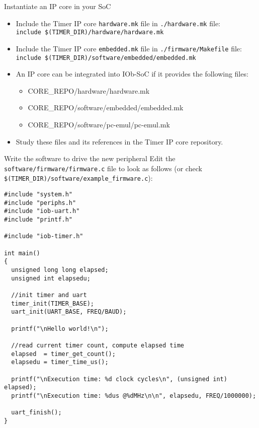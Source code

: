\documentclass [xcolor=svgnames, t] {beamer}
\begin{document}
\begin{frame}{Instantiate an IP core in your SoC}
  \begin{itemize}
  \item Include the Timer IP core {\tt hardware.mk} file in {\tt ./hardware.mk} file:\\
    {\tt \tiny include \$(TIMER\_DIR)/hardware/hardware.mk}
  \item Include the Timer IP core {\tt embedded.mk} file in {\tt ./firmware/Makefile} file:\\
    {\tt \tiny include \$(TIMER\_DIR)/software/embedded/embedded.mk}
  \item An IP core can be integrated into IOb-SoC if it provides the following files:
    \begin{itemize}
    \item CORE\_REPO/hardware/hardware.mk
    \item CORE\_REPO/software/embedded/embedded.mk
    \item CORE\_REPO/software/pc-emul/pc-emul.mk
    \end{itemize}
  \item Study these files and its references in the Timer IP core repository.
  \end{itemize}
\end{frame}

\begin{frame}[fragile]{Write the software to drive the new peripheral}
    Edit the {\tt software/firmware/firmware.c} file to look as follows (or check
    {\tt \$(TIMER\_DIR)/software/example\_firmware.c}):
  \begin{tiny}
    \begin{lstlisting}
#include "system.h"
#include "periphs.h"
#include "iob-uart.h"
#include "printf.h"

#include "iob-timer.h"

int main()
{
  unsigned long long elapsed;
  unsigned int elapsedu;

  //init timer and uart
  timer_init(TIMER_BASE);
  uart_init(UART_BASE, FREQ/BAUD);

  printf("\nHello world!\n");

  //read current timer count, compute elapsed time
  elapsed  = timer_get_count();
  elapsedu = timer_time_us();

  printf("\nExecution time: %d clock cycles\n", (unsigned int) elapsed);
  printf("\nExecution time: %dus @%dMHz\n\n", elapsedu, FREQ/1000000);

  uart_finish();
}
    \end{lstlisting}
  \end{tiny}
\end{frame}
\end{document}
